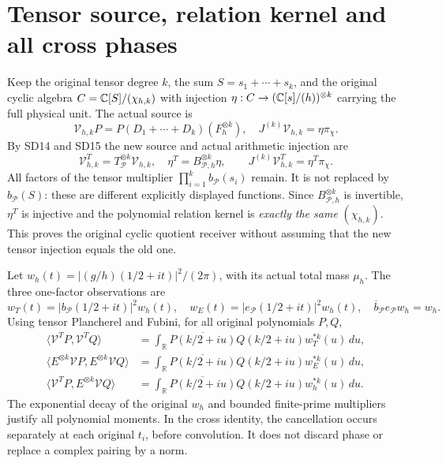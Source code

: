 \documentclass[11pt]{article}
\begin{document}
\section{Tensor source, relation kernel and all cross phases}
Keep the original tensor degree $k$, the sum $S=s_1+\cdots+s_k$,
and the original cyclic algebra $C=\mathbb C[S]/(\chi_{h,k})$ with
injection $\eta:C\to(\mathbb C[s]/(h))^{\otimes k}$ carrying the full
physical unit. The actual source is
\[
 \mathcal V_{h,k}P=P(D_1+\cdots+D_k)(F_h^{\otimes k}),\quad
 J^{(k)}\mathcal V_{h,k}=\eta\pi_\chi.
                                                               \tag{SD18}
\]
By SD14 and SD15 the new source and actual arithmetic injection are
\[
 \mathcal V^T_{h,k}=T_{\mathcal P}^{\otimes k}\mathcal V_{h,k},
 \quad\eta^T=B_{\mathcal P,h}^{\otimes k}\eta,
 \qquad J^{(k)}\mathcal V^T_{h,k}=\eta^T\pi_\chi.              \tag{SD19}
\]
All factors of the tensor multiplier
$\prod_{i=1}^kb_{\mathcal P}(s_i)$ remain. It is not replaced by
$b_{\mathcal P}(S)$: these are different explicitly displayed
functions. Since $B_{\mathcal P,h}^{\otimes k}$ is invertible,
$\eta^T$ is injective and the polynomial relation kernel is
\emph{exactly the same} $(\chi_{h,k})$. This proves the original
cyclic quotient receiver without assuming that the new tensor
injection equals the old one.

Let $w_h(t)=|(g/h)(1/2+it)|^2/(2\pi)$, with its actual total mass
$\mu_h$. The three one-factor observations are
\[
 w_T(t)=|b_{\mathcal P}(1/2+it)|^2w_h(t),\quad
 w_E(t)=|e_{\mathcal P}(1/2+it)|^2w_h(t),\quad
 \overline b_{\mathcal P}e_{\mathcal P}w_h=w_h.                \tag{SD20}
\]
Using tensor Plancherel and Fubini, for all original polynomials $P,Q$,
\begin{align*}
\langle\mathcal V^T P,\mathcal V^T Q\rangle
 &=\int_\mathbb R\overline{P(k/2+iu)}Q(k/2+iu)
                      w_T^{*k}(u)\,du,\\
\langle E^{\otimes k}\mathcal V P,E^{\otimes k}\mathcal V Q\rangle
 &=\int_\mathbb R\overline{P(k/2+iu)}Q(k/2+iu)
                      w_E^{*k}(u)\,du,\\
\boxed{\langle\mathcal V^T P,E^{\otimes k}\mathcal V Q\rangle}
 &=\boxed{\int_\mathbb R\overline{P(k/2+iu)}Q(k/2+iu)
                       w_h^{*k}(u)\,du.}                    \tag{SD21}
\end{align*}
The exponential decay of the original $w_h$ and bounded finite-prime
multipliers justify all polynomial moments. In the cross identity,
the cancellation occurs separately at each original $t_i$, before
convolution. It does not discard phase or replace a complex pairing
by a norm.
\end{document}
